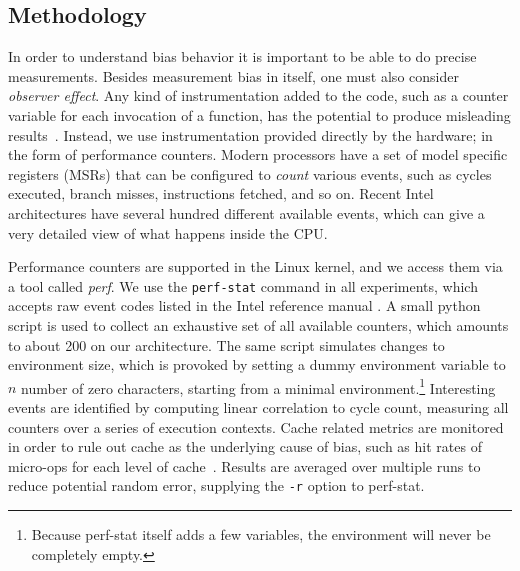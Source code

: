\documentclass[a4paper,10pt,twocolumn,twoside]{article}
\begin{document}
\subsection{Methodology}

In order to understand bias behavior it is important to be able to do precise measurements.
Besides measurement bias in itself, one must also consider \emph{observer effect}.
Any kind of instrumentation added to the code, such as a counter variable for each invocation of a function, has the potential to produce misleading results~\cite{Mytkowicz:2008:OE&MB}.
Instead, we use instrumentation provided directly by the hardware; in the form of performance counters. 
Modern processors have a set of model specific registers (MSRs) that can be configured to \emph{count} various events, such as cycles executed, branch misses, instructions fetched, and so on.
Recent Intel architectures have several hundred different available events, which can give a very detailed view of what happens inside the CPU.

Performance counters are supported in the Linux kernel, and we access them via a tool called \emph{perf}. 
We use the \texttt{perf-stat} command in all experiments, which accepts raw event codes listed in the Intel reference manual \cite{Intel:2013:Volume3B}.
A small python script is used to collect an exhaustive set of all available counters, which amounts to about 200 on our architecture.
The same script simulates changes to environment size, which is provoked by setting a dummy environment variable to $n$ number of zero characters, starting from a minimal environment.\footnote{Because perf-stat itself adds a few variables, the environment will never be completely empty.}
Interesting events are identified by computing linear correlation to cycle count, measuring all counters over a series of execution contexts.
Cache related metrics are monitored in order to rule out cache as the underlying cause of bias, such as hit rates of micro-ops for each level of cache~\cite{Intel:2012:OptimizationManual}.
Results are averaged over multiple runs to reduce potential random error, supplying the \texttt{-r} option to perf-stat. %
\end{document}
